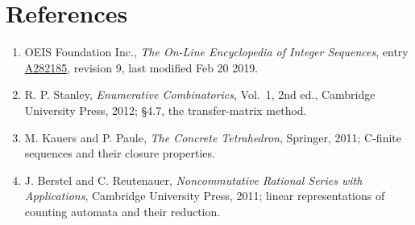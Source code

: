 \documentclass[11pt]{article}
\theoremstyle{definition}
\begin{document}
\section{References}

\begin{enumerate}

\item OEIS Foundation Inc., \emph{The On-Line Encyclopedia of Integer Sequences}, entry \href{https://oeis.org/A282185}{A282185}, revision 9, last modified Feb 20 2019.

\item R. P. Stanley, \emph{Enumerative Combinatorics}, Vol.~1, 2nd ed., Cambridge University Press, 2012; \S4.7, the transfer-matrix method.

\item M. Kauers and P. Paule, \emph{The Concrete Tetrahedron}, Springer, 2011; C-finite sequences and their closure properties.

\item J. Berstel and C. Reutenauer, \emph{Noncommutative Rational Series with Applications}, Cambridge University Press, 2011; linear representations of counting automata and their reduction.

\end{enumerate}
\end{document}
